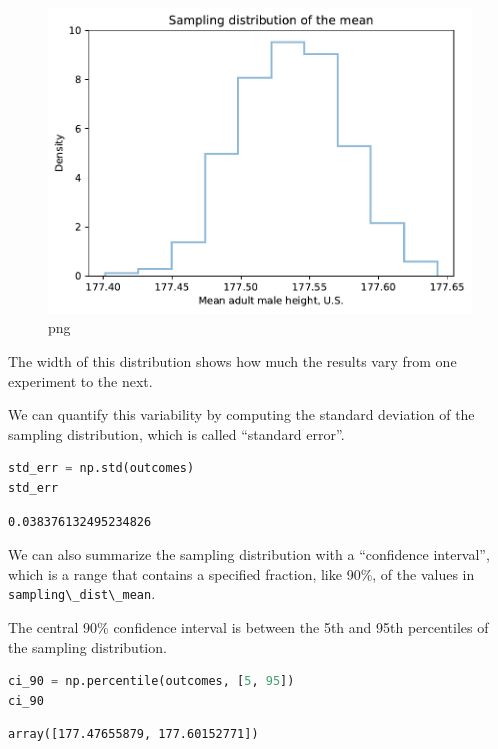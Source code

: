 \begin{figure}
\centering
\includegraphics{11_inference_files/11_inference_105_0.pdf}
\caption{png}
\end{figure}

The width of this distribution shows how much the results vary from one
experiment to the next.

We can quantify this variability by computing the standard deviation of
the sampling distribution, which is called ``standard error''.

\begin{lstlisting}[language=Python]
std_err = np.std(outcomes)
std_err
\end{lstlisting}

\begin{lstlisting}[]
0.038376132495234826
\end{lstlisting}

We can also summarize the sampling distribution with a ``confidence
interval'', which is a range that contains a specified fraction, like
90\%, of the values in \passthrough{\lstinline!sampling\_dist\_mean!}.

The central 90\% confidence interval is between the 5th and 95th
percentiles of the sampling distribution.

\begin{lstlisting}[language=Python]
ci_90 = np.percentile(outcomes, [5, 95])
ci_90
\end{lstlisting}

\begin{lstlisting}[]
array([177.47655879, 177.60152771])
\end{lstlisting}

